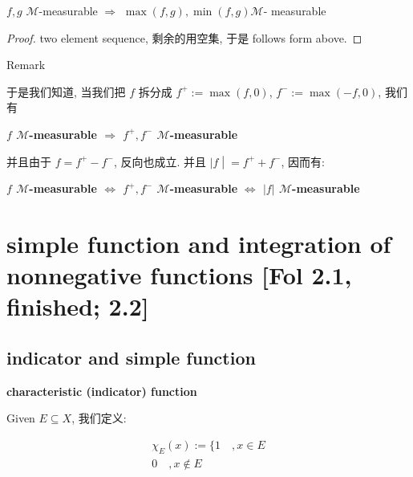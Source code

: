 \documentclass{qlnotes-export}
\begin{document}
\begin{corollary}

\(f,g\) \(\mathcal{M}\)-measurable \(\Longrightarrow\) \(\max(f,g),\min(f,g)\)\(\mathcal{M}\)- measurable

\end{corollary}

\begin{proof}

two element sequence, 剩余的用空集, 于是 follows form above.

\end{proof}

\begin{qlremark}{Remark}

于是我们知道, 当我们把 \(f\) 拆分成 \(f^{+} := \max(f,0)\), \(f^{-} := \max( - f,0)\), 我们有

\textbf{\(f\) \(\mathcal{M}\)-measurable \(\Longrightarrow\) \(f^{+},f^{-}\) \(\mathcal{M}\)-measurable}

并且由于 \(f = f^{+} - f^{-}\), 反向也成立. 并且 \(\left. |f \middle| = f^{+} + f^{-} \right.\), 因而有:

\textbf{\(f\) \(\mathcal{M}\)-measurable \(\Leftrightarrow\) \(f^{+},f^{-}\) \(\mathcal{M}\)-measurable} \textbf{\(\Leftrightarrow\) \(|f|\) \(\mathcal{M}\)-measurable}

\end{qlremark}

\section{simple function and integration of nonnegative functions {[}Fol 2.1, finished; 2.2{]}}

\subsection{indicator and simple function}\label{indicator-and-simple-function}

\begin{definition}{\protect{}\label{kn-characteristic-indicator-function}{\textbf{characteristic
(indicator) function}}}

Given \(E \subseteq X\), 我们定义:

\[\begin{matrix}
{\chi_{E}(x) := \{ 1\quad,x \in E} \\
{0\quad,x \notin E}
\end{matrix}\]

\end{definition}
\end{document}
